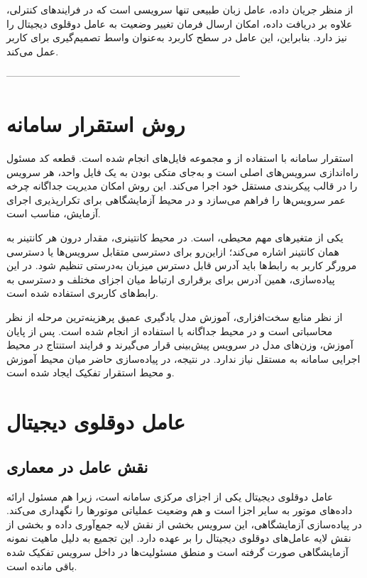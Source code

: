 از منظر جریان داده، عامل زبان طبیعی تنها سرویسی است که در فرایندهای کنترلی، علاوه بر دریافت داده، امکان ارسال فرمان تغییر وضعیت به عامل دوقلوی دیجیتال را نیز دارد. بنابراین، این عامل در سطح کاربرد به‌عنوان واسط تصمیم‌گیری برای کاربر عمل می‌کند.


 -----------------------------------------------------------------------
\section{روش استقرار سامانه}
\label{sec:deployment}

استقرار سامانه با استفاده از  و مجموعه فایل‌های  انجام شده است. قطعه کد  مسئول راه‌اندازی سرویس‌های اصلی است و به‌جای متکی بودن به یک فایل واحد، هر سرویس را در قالب پیکربندی مستقل خود اجرا می‌کند. این روش امکان مدیریت جداگانه چرخه عمر سرویس‌ها را فراهم می‌سازد و در محیط آزمایشگاهی برای تکرارپذیری اجرای آزمایش، مناسب است.

یکی از متغیرهای مهم محیطی،  است. در محیط کانتینری، مقدار  درون هر کانتینر به همان کانتینر اشاره می‌کند؛ ازاین‌رو برای دسترسی متقابل سرویس‌ها یا دسترسی مرورگر کاربر به رابط‌ها باید آدرس قابل دسترس میزبان به‌درستی تنظیم شود. در این پیاده‌سازی، همین آدرس برای برقراری ارتباط میان اجزای مختلف و دسترسی به رابط‌های کاربری استفاده شده است.

از نظر منابع سخت‌افزاری، آموزش مدل یادگیری عمیق پرهزینه‌ترین مرحله از نظر محاسباتی است و در محیط جداگانه با استفاده از  انجام شده است. پس از پایان آموزش، وزن‌های مدل در سرویس پیش‌بینی قرار می‌گیرند و فرایند استنتاج در محیط اجرایی سامانه به  مستقل نیاز ندارد. در نتیجه، در پیاده‌سازی حاضر میان محیط آموزش و محیط استقرار تفکیک ایجاد شده‌ است.


\section{عامل دوقلوی دیجیتال}
\label{sec:impl-dtwin}

\subsection{نقش عامل در معماری}

عامل دوقلوی دیجیتال یکی از اجزای مرکزی سامانه است، زیرا هم مسئول ارائه داده‌های موتور به سایر اجزا است و هم وضعیت عملیاتی موتورها را نگهداری می‌کند. در پیاده‌سازی آزمایشگاهی، این سرویس بخشی از نقش لایه جمع‌آوری داده و بخشی از نقش لایه عامل‌های دوقلوی دیجیتال را بر عهده دارد. این تجمیع به دلیل ماهیت نمونه آزمایشگاهی صورت گرفته است و منطق مسئولیت‌ها در داخل سرویس تفکیک شده باقی مانده است.

